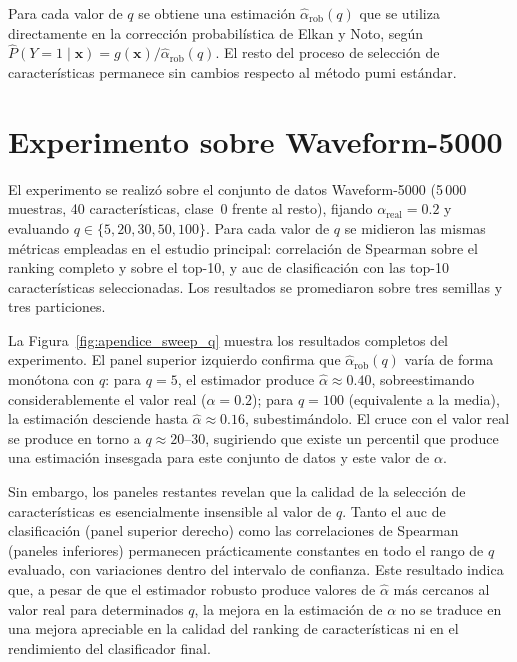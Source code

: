 Para cada valor de $q$ se obtiene una estimación $\hat{\alpha}_{\text{rob}}(q)$ que se utiliza directamente en la corrección probabilística de Elkan y Noto, según $\hat{P}(Y=1 \mid \mathbf{x}) = g(\mathbf{x}) / \hat{\alpha}_{\text{rob}}(q)$. El resto del proceso de selección de características permanece sin cambios respecto al método \acrshort{pumi} estándar.

\section{Experimento sobre Waveform-5000}
\label{sec:apendice_experimento}

El experimento se realizó sobre el conjunto de datos Waveform-5000 (5\,000 muestras, 40 características, clase~0 frente al resto), fijando $\alpha_{\text{real}} = 0.2$ y evaluando $q \in \{5, 20, 30, 50, 100\}$. Para cada valor de $q$ se midieron las mismas métricas empleadas en el estudio principal: correlación de Spearman sobre el ranking completo y sobre el top-10, y \acrshort{auc} de clasificación con las top-10 características seleccionadas. Los resultados se promediaron sobre tres semillas y tres particiones.

La Figura~\ref{fig:apendice_sweep_q} muestra los resultados completos del experimento. El panel superior izquierdo confirma que $\hat{\alpha}_{\text{rob}}(q)$ varía de forma monótona con $q$: para $q=5$, el estimador produce $\hat{\alpha} \approx 0.40$, sobreestimando considerablemente el valor real ($\alpha=0.2$); para $q=100$ (equivalente a la media), la estimación desciende hasta $\hat{\alpha} \approx 0.16$, subestimándolo. El cruce con el valor real se produce en torno a $q \approx 20$--$30$, sugiriendo que existe un percentil que produce una estimación insesgada para este conjunto de datos y este valor de $\alpha$.

Sin embargo, los paneles restantes revelan que la calidad de la selección de características es esencialmente insensible al valor de $q$. Tanto el \acrshort{auc} de clasificación (panel superior derecho) como las correlaciones de Spearman (paneles inferiores) permanecen prácticamente constantes en todo el rango de $q$ evaluado, con variaciones dentro del intervalo de confianza. Este resultado indica que, a pesar de que el estimador robusto produce valores de $\hat{\alpha}$ más cercanos al valor real para determinados $q$, la mejora en la estimación de $\alpha$ no se traduce en una mejora apreciable en la calidad del ranking de características ni en el rendimiento del clasificador final.

